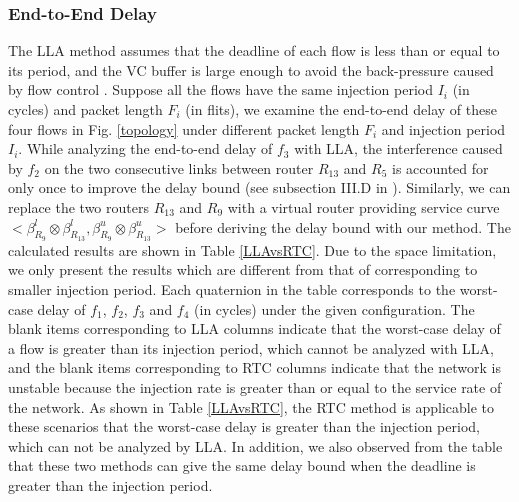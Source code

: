 \documentclass[preprint]{elsarticle}
\begin{document}
\subsubsection{End-to-End Delay}
The LLA method assumes that the deadline of each flow is less than or equal to its period, and the VC buffer is large enough to avoid the back-pressure caused by flow control \cite{189}. Suppose all the flows have the same injection period $I_i$ (in cycles) and packet length $F_i$ (in flits), we examine the end-to-end delay of these four flows in Fig. \ref{topology} under different packet length $F_i$ and injection period $I_i$. While analyzing the end-to-end delay of $f_3$ with LLA, the interference caused by $f_2$ on the two consecutive links between router $R_{13}$ and $R_5$ is accounted for only once to improve the delay bound (see subsection III.D in \cite{189}). Similarly, we can replace the two routers $R_{13}$ and $R_9$ with a virtual router providing service curve $<\beta_{R_9}^l\otimes\beta_{R_{13}}^l,\beta_{R_9}^u\otimes\beta_{R_{13}}^u>$ before deriving the delay bound with our method. The calculated results are shown in Table \ref{LLAvsRTC}. Due to the space limitation, we only present the results which are different from that of corresponding to smaller injection period. Each quaternion in the table corresponds to the worst-case delay of $f_1$, $f_2$, $f_3$ and $f_4$ (in cycles) under the given configuration. The blank items corresponding to LLA columns indicate that the worst-case delay of a flow is greater than its injection period, which cannot be analyzed with LLA, and the blank items corresponding to RTC columns indicate that the network is unstable because the injection rate is greater than or equal to the service rate of the network. As shown in Table \ref{LLAvsRTC}, the RTC method is applicable to these scenarios that the worst-case delay is greater than the injection period, which can not be analyzed by LLA. In addition, we also observed from the table that these two methods can give the same delay bound when the deadline is greater than the injection period.
\end{document}
